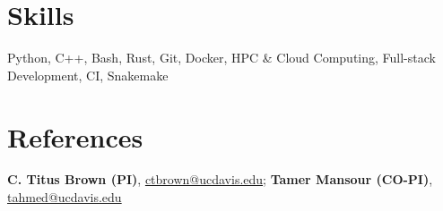 \section{Skills}
Python, C++, Bash, Rust, Git, Docker, HPC \& Cloud Computing, Full-stack Development, CI, Snakemake

\section{References}
\textbf{C. Titus Brown (PI)}, \href{mailto:ctbrown@ucdavis.edu}{ctbrown@ucdavis.edu}; \textbf{Tamer Mansour (CO-PI)}, \href{mailto:tahmed@ucdavis.edu}{tahmed@ucdavis.edu}

